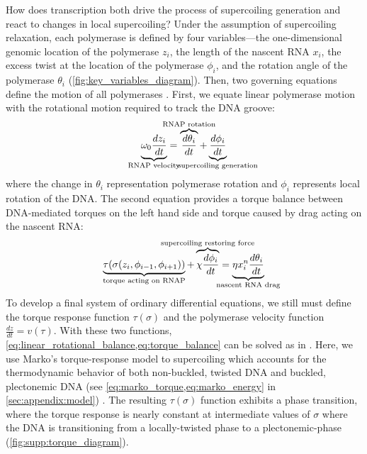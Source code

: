 \documentclass[11pt]{article}
\begin{document}
How does transcription both drive the process of supercoiling generation and react to changes in local supercoiling? Under the assumption of supercoiling relaxation, each polymerase is defined by four variables---the one-dimensional genomic location of the polymerase \(z_i\), the length of the nascent RNA \(x_i\), the excess twist at the location of the polymerase \(\phi_i\), and the rotation angle of the polymerase \(\theta_i\) (\cref{fig:key_variables_diagram}). Then, two governing equations define the motion of all polymerases \parencite{sevierPropertiesGeneExpression2018}. First, we equate linear polymerase motion with the rotational motion required to track the DNA groove:
\begin{equation}
    \underbrace{\omega_0 \frac{dz_i}{dt}}_{\mathclap{\text{RNAP velocity}}} = \overbrace{\frac{d\theta_i}{dt}}^{\mathclap{\text{RNAP rotation}}} + \underbrace{\frac{d\phi_i}{dt}}_{\mathclap{\text{supercoiling generation}}}
\label{eq:linear_rotational_balance}
\end{equation}
where the change in \(\theta_i\) representation polymerase rotation and \(\phi_i\) represents local rotation of the DNA.
The second equation provides a torque balance between DNA-mediated torques on the left hand side and torque caused by drag acting on the nascent RNA:
\begin{equation}
    \underbrace{\tau(\sigma(z_i, \phi_{i-1}, \phi_{i+1}))}_{\mathclap{\text{torque acting on RNAP}}} + \overbrace{\chi \frac{d\phi_i}{dt}}^{\mathclap{\text{supercoiling restoring force}}}= \underbrace{\eta x_i^n \frac{d\theta_i}{dt}}_{\mathclap{\text{nascent RNA drag}}}
\label{eq:torque_balance}
\end{equation}
To develop a final system of ordinary differential equations, we still must define the torque response function \(\tau(\sigma)\) and the polymerase velocity function \(\frac{dz}{dt} = v(\tau)\). With these two functions, \cref{eq:linear_rotational_balance,eq:torque_balance} can be solved as in \textcite{sevierPropertiesGeneExpression2018}. Here, we use Marko's torque-response model to supercoiling which accounts for the thermodynamic behavior of both non-buckled, twisted DNA and buckled, plectonemic DNA (see \cref{eq:marko_torque,eq:marko_energy} in \cref{sec:appendix:model}) \parencite{markoTorqueDynamicsLinking2007}. The resulting \(\tau(\sigma)\) function exhibits a phase transition, where the torque response is nearly constant at intermediate values of \(\sigma\) where the DNA is transitioning from a locally-twisted phase to a plectonemic-phase (\cref{fig:supp:torque_diagram}).
\end{document}
